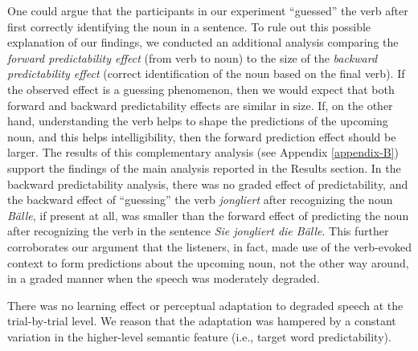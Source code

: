 \documentclass[a4paper, nobind]{templates/ociamthesis}
\begin{document}
One could argue that the participants in our experiment ``guessed'' the verb after first correctly identifying the noun in a sentence.
To rule out this possible explanation of our findings, we conducted an additional analysis comparing the \emph{forward predictability effect} (from verb to noun) to the size of the \emph{backward predictability effect} (correct identification of the noun based on the final verb).
If the observed effect is a guessing phenomenon, then we would expect that both forward and backward predictability effects are similar in size.
If, on the other hand, understanding the verb helps to shape the predictions of the upcoming noun, and this helps intelligibility, then the forward prediction effect should be larger.
The results of this complementary analysis (see Appendix \ref{appendix-B}) support the findings of the main analysis reported in the Results section.
In the backward predictability analysis, there was no graded effect of predictability, and the backward effect of ``guessing'' the verb \emph{jongliert} after recognizing the noun \emph{Bälle}, if present at all, was smaller than the forward effect of predicting the noun after recognizing the verb in the sentence \emph{Sie jongliert die Bälle}.
This further corroborates our argument that the listeners, in fact, made use of the verb-evoked context to form predictions about the upcoming noun, not the other way around, in a graded manner when the speech was moderately degraded.

There was no learning effect or perceptual adaptation to degraded speech at the trial-by-trial level.
We reason that the adaptation was hampered by a constant variation in the higher-level semantic feature (i.e., target word predictability).
\end{document}

